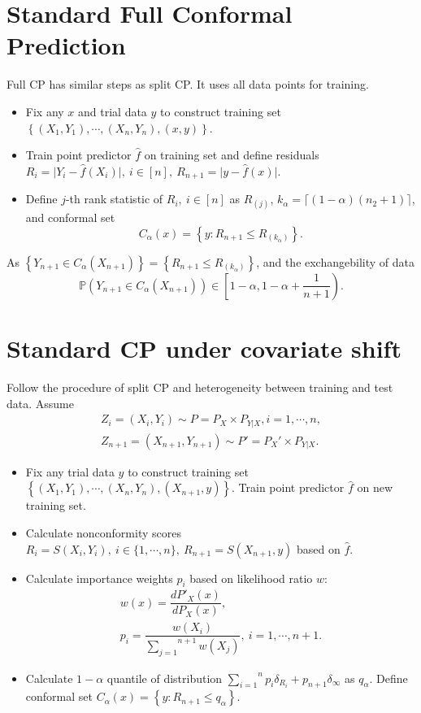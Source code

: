 \documentclass[12pt, a4paper, oneside]{article}
\begin{document}
\section{Standard Full Conformal Prediction}
    Full CP has similar steps as split CP. It uses all data points for training.
    \begin{itemize}
        \item Fix any $x$ and trial data $y$ to construct training set $\left\{ (X_1,Y_1),\cdots,(X_n,Y_n),(x,y) \right\}$.
        \item Train point predictor $\hat{f}$ on training set and define residuals $R_i=\Big|Y_i-\hat{f}(X_i)\Big|,\ i\in[n],\ R_{n+1}=\Big|y-\hat{f}(x)\Big|$.
        \item Define $j$-th rank statistic of $R_i,\ i\in[n]$ as $R_{(j)}$, $k_\alpha=\lceil (1-\alpha)(n_2+1)\rceil$, and conformal set
        \begin{equation*}
            C_\alpha(x)=\left\{ y:R_{n+1}\leq R_{(k_\alpha)} \right\}.
        \end{equation*}
    \end{itemize}
    As $\left\{ Y_{n+1}\in C_\alpha(X_{n+1}) \right\}=\left\{ R_{n+1}\leq R_{(k_\alpha)} \right\}$, and the exchangebility of data
    \begin{equation*}
        \mathbb{P}\left( Y_{n+1}\in C_\alpha(X_{n+1}) \right)\in\left[1-\alpha,1-\alpha+\dfrac{1}{n+1}\right).
    \end{equation*}


\section{Standard CP under covariate shift}
    Follow the procedure of split CP and heterogeneity between training and test data\cite{tibshirani2019conformal}. Assume
    \begin{gather*}
        Z_i=(X_i,Y_i)\sim P=P_X\times P_{Y|X},i=1,\cdots,n,\\
        Z_{n+1}=(X_{n+1},Y_{n+1})\sim P'=P_X'\times P_{Y|X}.
    \end{gather*}
    \begin{itemize}
        \item Fix any trial data $y$ to construct training set $\left\{ (X_1,Y_1),\cdots,(X_n,Y_n),(X_{n+1},y) \right\}$. Train point predictor $\hat{f}$ on new training set.
        \item Calculate nonconformity scores $R_i=S(X_i,Y_i),\ i\in\{1,\cdots,n\},\ R_{n+1}=S(X_{n+1},y)$ based on $\hat{f}$.
        \item Calculate importance weights $p_i$ based on likelihood ratio $w$:
        \begin{gather*}
            w(x)=\dfrac{dP'_X(x)}{dP_X(x)},\\
            p_i=\dfrac{w(X_i)}{\overset{n+1}{\underset{j=1}\sum}w(X_j)},\ i=1,\cdots,n+1.
        \end{gather*}
        \item Calculate $1-\alpha$ quantile of distribution $\overset{n}{\underset{i=1}\sum}p_i\delta_{R_i}+p_{n+1}\delta_{\infty}$ as $q_\alpha$. Define conformal set $C_\alpha(x)=\left\{ y:R_{n+1}\leq q_\alpha \right\}$.
    \end{itemize}
\end{document}
